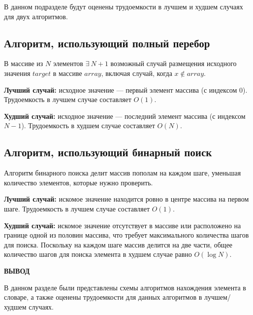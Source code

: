 В данном подразделе будут оценены трудоемкости в лучшем и худшем случаях для двух алгоритмов.

\subsection{Алгоритм, использующий полный перебор}

В массиве из $N$ элементов $\exists\ N+1$ возможный случай размещения исходного значения $target$ в массиве $array$, включая случай, когда $x \notin array$.

\textbf{Лучший случай:} исходное значение --- первый элемент массива (с индексом $0$). Трудоемкость в лучшем случае составляет $O(1)$.

\textbf{Худший случай:} исходное значение --- последний элемент массива (с индексом $N - 1$). Трудоемкость в худшем случае составляет $O(N)$.

\subsection{Алгоритм, использующий бинарный поиск}

Алгоритм бинарного поиска делит массив пополам на каждом шаге, уменьшая количество элементов, которые нужно проверить.

\textbf{Лучший случай:} искомое значение находится ровно в центре массива на первом шаге. Трудоемкость в лучшем случае составляет \(O(1)\).

\textbf{Худший случай:} искомое значение отсутствует в массиве или расположено на границе одной из половин массива, что требует максимального количества шагов для поиска. Поскольку на каждом шаге массив делится на две части, общее количество шагов для поиска элемента в худшем случае равно \(O(\log N)\).

\vspace{5mm}

\textbf{ВЫВОД}

 В данном разделе были представлены схемы алгоритмов нахождения элемента в словаре, а также оценены трудоемкости для данных алгоритмов в лучшем/худшем случаях.

\clearpage